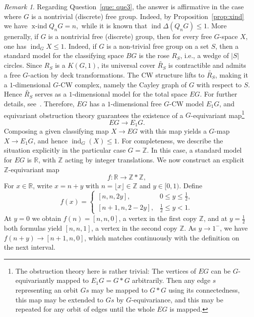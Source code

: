 \documentclass[preprint,12pt]{article}
\renewcommand{\le}{\leqslant}
\theoremstyle{definition}
\theoremstyle{remark}
\newtheorem{remark}[theorem]{Remark}
\numberwithin{equation}{section}
\DeclareMathOperator{\ind}{ind}
\DeclareMathOperator{\xind}{x-ind}
\begin{document}
\begin{remark}
Regarding Question~\ref{que: que3}, the answer is affirmative in the case where $G$ is a nontrivial (discrete) free group. Indeed, by Proposition~\ref{prop:xind} we have 
\(
\xind Q_n G = n,
\)
while it is known that 
\(
\ind \Delta(Q_n G) \le 1
\). More generally, if $G$ is a nontrivial free (discrete) group, then for every free $G$-space $X$, one has $\ind_G X \le 1$. Indeed, if $G$ is a non-trivial free group on a set $S$, then a standard model for the classifying space $BG$ is the rose $R_S$, i.e., a wedge of $|S|$ circles. Since $R_S$ is a $K(G,1)$, its universal cover $\widetilde{R_S}$ is contractible and admits a free $G$-action by deck transformations. The CW structure lifts to $\widetilde{R_S}$, making it a $1$-dimensional $G$-CW complex, namely the Cayley graph of $G$ with respect to $S$. Hence $\widetilde{R_S}$ serves as a $1$-dimensional model for the total space $EG$. For further details, see~\cite[Section 1.B]{Hatcher2002AlgebraicTopology}. Therefore, $EG$ has a $1$-dimensional free $G$-CW model $E_1G$, and equivariant obstruction theory guarantees the existence of a $G$-equivariant map\footnote{The obstruction theory here is rather trivial: The vertices of $EG$ can be $G$-equivariantly mapped to $E_1G=G*G$ arbitrarily. Then any edge $s$ representing an orbit $Gs$ may be mapped to $G*G$ using its connectedness, this map may be extended to $Gs$ by $G$-equivariance, and this may be repeated for any orbit of edges until the whole $EG$ is mapped.}
\[
EG \longrightarrow E_1G.
\]
Composing a given classifying map $X \to EG$ with this map yields a $G$-map $X \to E_1G$, and hence $\ind_G(X) \le 1$. For completeness, we describe the situation explicitly in the particular case $G = \mathbb{Z}$. In this case, a standard model for $EG$ is $\mathbb{R}$, with $\mathbb{Z}$ acting by integer translations. We now construct an explicit $\mathbb{Z}$-equivariant map
\[
f \colon \mathbb{R} \longrightarrow \mathbb{Z} * \mathbb{Z},
\]
For $x \in \mathbb{R}$, write $x = n + y$ with $n = \lfloor x \rfloor \in \mathbb{Z}$ and $y \in [0,1)$. Define
\[
f(x) =
\begin{cases}
[n, n, 2y], & 0 \le y \le \frac{1}{2},\\[4pt]
[n+1, n, 2 - 2y], & \frac{1}{2} \le y < 1.
\end{cases}
\]
At $y=0$ we obtain $f(n) = [n,n,0]$, a vertex in the first copy $\mathbb{Z}$, and at $y = \tfrac{1}{2}$ both formulas yield $[n,n,1]$, a vertex in the second copy $\mathbb{Z}$. As $y \to 1^{-}$, we have $f(n+y) \to [n+1,n,0]$, which matches continuously with the definition on the next interval.


\end{remark}
\end{document}
